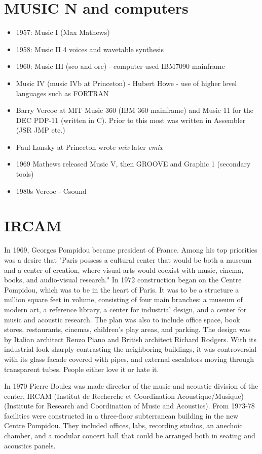 \section{MUSIC N and computers}
\begin{itemize}
\item 1957: Music I (Max Mathews)
\item 1958: Music II 4 voices and wavetable synthesis
\item 1960: Music III (sco and orc) - computer used IBM7090 mainframe
\item Music IV (music IVb at Princeton) - Hubert Howe - use of higher level languages such as FORTRAN
\item Barry Vercoe at MIT Music 360 (IBM 360 mainframe) and Music 11 for the DEC PDP-11 (written in C). Prior to this most was written in Assembler (JSR JMP etc.)
\item Paul Lansky at Princeton wrote \textit{mix} later \textit{cmix}
\item 1969 Mathews released Music V, then GROOVE and Graphic 1 (secondary tools)
\item 1980s Vercoe - Csound
\end{itemize}



\section{IRCAM}
In 1969, Georges Pompidou became president of France. Among his top priorities was a desire that "Paris possess a cultural center that would be both a museum and a center of creation, where visual arts would coexist with music, cinema, books, and audio-visual research."
In 1972 construction began on the Centre Pompidou, which was to be in the heart of Paris. It was to be a structure a million square feet in volume, consisting of four main branches: a museum of modern art, a reference library, a center for industrial design, and a center for music and acoustic research. The plan was also to include office space, book stores, restaurants, cinemas, children's play areas, and parking. The design was by Italian architect Renzo Piano and British architect Richard Rodgers. With its industrial look sharply contrasting the neighboring buildings, it was controversial with its glass facade covered with pipes, and external escalators moving through transparent tubes. People either love it or hate it.

In 1970 Pierre Boulez was made director of the music and acoustic division of the center, IRCAM (Institut de Recherche et Coordination Acoustique/Musique) (Institute for Research and Coordination of Music and Acoustics).
From 1973-78 facilities were constructed in a three-floor subterranean building in the new Centre Pompidou. They included offices, labs, recording studios, an anechoic chamber, and a modular concert hall that could be arranged both in seating and acoustics panels.

